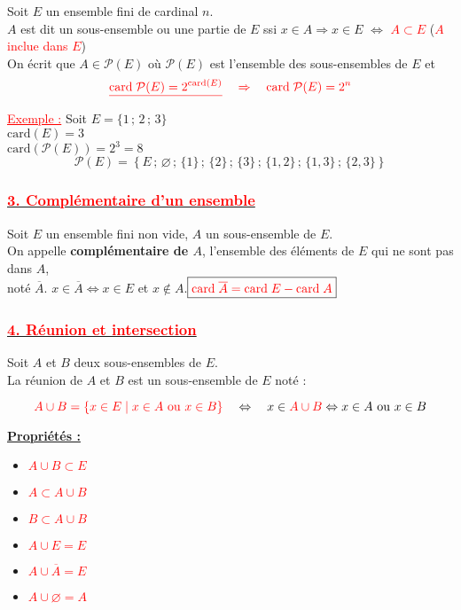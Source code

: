 \documentclass[a4paper,12pt]{article}
\begin{document}
Soit $E$ un ensemble fini de cardinal $n$.\\
$A$ est dit un sous-ensemble ou une partie de $E$ ssi $x \in A \Rightarrow x \in E$ $\Leftrightarrow$ \textcolor{red}{\underline{$A \subset E$}} \quad (\textcolor{red}{\small $A$ inclue dans $E$})\\
On écrit que $A \in \mathcal{P}(E)$ où $\mathcal{P}(E)$ est l’ensemble des sous-ensembles de $E$ et 
\[
\textcolor{red}{\underline{\text{card} \; \mathcal{P}(E) = 2^{\text{card}(E)}} \quad \Rightarrow \quad \text{card} \; \mathcal{P}(E) = 2^n}
\]

\textcolor{red}{\underline{Exemple :}} Soit $E = \{1\, ;\, 2\, ;\, 3\}$\\
$\text{card}(E) = 3$\\
$\text{card}(\mathcal{P}(E)) = 2^3 = 8$\\
\[
\mathcal{P}(E) = \left\{ 
E\, ;\,
\varnothing\, ;\,
\{1\}\, ;\,
\{2\}\, ;\,
\{3\}\, ;\,
\{1,2\}\, ;\,
\{1,3\}\, ;\,
\{2,3\}
\right\}
\]

\subsubsection*{\underline{\textcolor{red}{3. Complémentaire d’un ensemble}}}

Soit $E$ un ensemble fini non vide, $A$ un sous-ensemble de $E$.\\
On appelle \textbf{complémentaire de $A$}, l’ensemble des éléments de $E$ qui ne sont pas dans $A$,\\
noté $\overline{A}$. \quad $x \in \overline{A} \Leftrightarrow x \in E$ et $x \notin A$.\( \boxed{\textcolor{red}{\text{card} \; \overline{A} = \text{card} \; E - \text{card} \; A}} \)

\subsubsection*{\underline{\textcolor{red}{4. Réunion et intersection}}}

Soit $A$ et $B$ deux sous-ensembles de $E$.\\
La réunion de $A$ et $B$ est un sous-ensemble de $E$ noté :

\[
\textcolor{red}{A \cup B = \{ x \in E \mid x \in A \text{ ou } x \in B \}}
\quad \Leftrightarrow \quad
x \in \textcolor{red}{A \cup B} \Leftrightarrow x \in A \text{ ou } x \in B
\]

\vspace{0.3cm}
\underline{\textbf{Propriétés :}}
\begin{multicols}{2}
\begin{itemize}
    \item \textcolor{red}{$A \cup B \subset E$}
    \item \textcolor{red}{$A \subset A \cup B$}
    \item \textcolor{red}{$B \subset A \cup B$}
    \item \textcolor{red}{$A \cup E = E$}
    \item \textcolor{red}{$A \cup \overline{A} = E$}
    \item \textcolor{red}{$A \cup \varnothing = A$}
\end{itemize}
\end{multicols}
\end{document}

